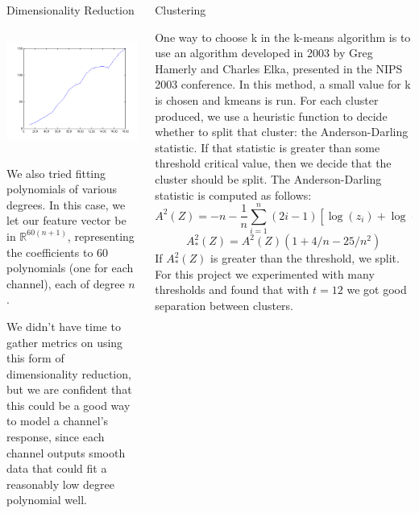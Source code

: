 \documentclass[final,t]{beamer}
\begin{document}
\begin{frame}{}
\begin{columns}[t]
\begin{column}{.3\linewidth}
\begin{block}{Dimensionality Reduction}
\begin{columns}[c]
         \includegraphics[width=0.97\linewidth]{images/dim_vs_runningtime.png}
       \end{columns}

       \par
         We also tried fitting polynomials of various degrees. In this
         case, we let our feature vector be in $\mathbb{R}^{60(n+1)}$,
         representing the coefficients to 60 polynomials (one for each
         channel), each of degree $n$.

         We didn't have time to gather metrics on using this form of
         dimensionality reduction, but we are confident that this could be
         a good way to model a channel's response, since each channel
         outputs smooth data that could fit a reasonably low degree
         polynomial well.
     \end{block}
   \end{column}
   
    
    \begin{column}{.3\linewidth}
      \begin{block}{Clustering}
        \par
        One way to choose k in the k-means algorithm is to use an algorithm
developed in 2003 by Greg Hamerly and Charles Elka, presented in the NIPS
2003 conference. In this method, a small value for k is
chosen and kmeans is run. For each cluster produced, we use a
heuristic function to decide whether to split that cluster: the
Anderson-Darling statistic. If that statistic is greater than
some threshold critical value, then we decide that the cluster should be
split. The Anderson-Darling statistic is computed as follows:
$$
A^2(Z) = -n - \frac{1}{n}\sum_{i=1}^n (2i -
1)[\log(z_i)+\log(1-z_{n+1-i})]
$$$$
A^2_*(Z) = A^2(Z)(1 + 4/n - 25/n^2)
$$
If $A^2_*(Z)$ is greater than the threshold, we split. For this
project we experimented with many thresholds and found that with $t=12$ we
got good separation between clusters.


\end{block}
\end{column}
\end{columns}
\end{frame}
\end{document}
